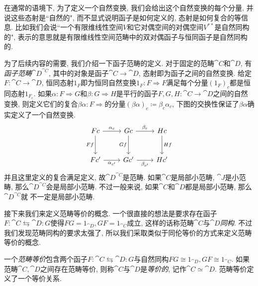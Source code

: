 在通常的语境下, 为了定义一个自然变换, 我们会给出这个自然变换的每个分量, 并说这些态射是``自然的", 而不显式说明函子是如何定义的, 态射是如何复合的等信息. 比如我们会说``一个有限维线性空间$V$和它对偶空间的对偶空间$V^{**}$是自然同构的", 表示的意思就是有限维线性空间范畴中的双对偶函子与恒同函子是自然同构的.


为了后续内容的需要, 我们介绍一下函子范畴的定义. 对于固定的范畴$\cat{C}$和$\cat{D}$, 有\emph{函子范畴}$\cat{D}^{\cat{C}}$, 其中的对象是函子$\cat{C}\to\cat{D}$, 态射即为函子之间的自然变换. 给定$F\colon \cat{C}\to \cat{D}$, 恒同态射$1_F$即为恒同自然变换$1_F\colon F\Rightarrow F$满足每个分量$(1_F)_c$都是恒同态射$1_{F_c}$. 如果$\alpha\colon F\Rightarrow G$和$\beta\colon G\Rightarrow H$是平行的函子$F, G, H\colon \cat{C}\to \cat{D}$之间的自然变换, 则定义它们的复合$\beta\alpha\colon F\Rightarrow$的分量$(\beta\alpha)_c\coloneq \beta_c\alpha_c$, 下图的交换性保证了$\beta\alpha$确实定义了一个自然变换\parencite[44, Lemma 1.7.1]{riehl_category_2017}.
\begin{equation*}
  \begin{tikzcd}[row sep=large]
    Fc & Gc & Hc\\
    Fc' & Gc' & Hc'
    \arrow[from=1-1,]{1-2}[above]{\alpha_c}
    \arrow[from=1-2,]{1-3}[above]{\beta_c}
    \arrow[from=2-1,]{2-2}[below]{\alpha_{c'}}
    \arrow[from=2-2,]{2-3}[below]{\beta_{c'}}
    \arrow[from=1-1,]{2-1}[left]{Ff}
    \arrow[from=1-2,]{2-2}[left]{Gf}
    \arrow[from=1-3,]{2-3}[right]{Hf}
  \end{tikzcd}
\end{equation*}
并且这里定义的复合满足定义\parencite[44, Corollary 1.7.2]{riehl_category_2017}, 故$\cat{D}^{\cat{C}}$是范畴. 如果$\cat{C}$是局部小范畴, $\cat{J}$是小范畴, 那么$\cat{D}^{\cat{C}}$会是局部小范畴. 不过一般来说, 如果$\cat{C}$和$\cat{D}$都是局部小范畴, 那么$\cat{D}^{\cat{C}}$就
不一定是局部小范畴.

接下来我们来定义范畴等价的概念. 一个很直接的想法是要求存在函子$F\colon \cat{C}\leftrightarrows \cat{D}\colon G$使得$FG=1_{\cat{D}}, GF=1_{\cat{C}}$成立, 这样的话称范畴$\cat{C}$与$\cat{D}$\emph{同构}. 不过我们发现范畴同构的要求太强了\parencite[21]{riehl_category_2017}, 所以我们采取类似于同伦等价的方式来定义范畴等价的概念.

一个\emph{范畴等价}包含两个函子$F\colon \cat{C}\leftrightarrows \cat{D}\colon G$与自然同构$FG\cong 1_{\cat{D}}, GF\cong 1_{\cat{C}}$. 如果范畴$\cat{C}, \cat{D}$之间存在范畴等价, 则称$\cat{C}$与$\cat{D}$是\emph{等价的}, 记作$\cat{C}\simeq\cat{D}$. 范畴等价定义了一个等价关系\parencite[30, Lemma 1.5.5]{riehl_category_2017}.

